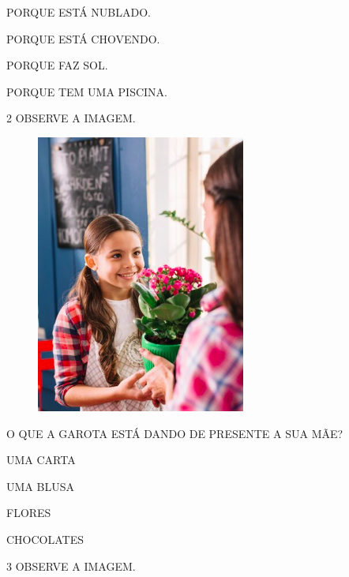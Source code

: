 \begin{escolha}
\item PORQUE ESTÁ NUBLADO.

\item PORQUE ESTÁ CHOVENDO.

\item PORQUE FAZ SOL.

\item  PORQUE TEM UMA PISCINA.
\end{escolha}

\pagebreak
\num{2} OBSERVE A IMAGEM.

\begin{figure}[htpb!]
\centering
\includegraphics[width=.5\textwidth]{media/image175b.png}
\end{figure}

O QUE A GAROTA ESTÁ DANDO DE PRESENTE A SUA MÃE?

\begin{escolha}
\item UMA CARTA

\item UMA BLUSA

\item FLORES

\item CHOCOLATES
\end{escolha}

\pagebreak
\num{3} OBSERVE A IMAGEM.

